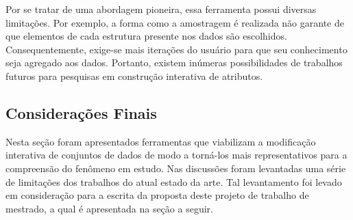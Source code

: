 Por se tratar de uma abordagem pioneira, essa ferramenta
possui diversas limitações. Por exemplo, a forma como a
amostragem é realizada não garante de que elementos de cada
estrutura presente nos dados são escolhidos.
Consequentemente, exige-se mais iterações do usuário 
para que seu conhecimento seja agregado aos dados. Portanto,
existem inúmeras possibilidades de trabalhos futuros para
pesquisas em construção interativa de atributos.

\subsection{Considerações Finais}

Nesta seção foram apresentados ferramentas que viabilizam a
modificação interativa de conjuntos de dados de modo a
torná-los mais representativos para a compreensão do
fenômeno em estudo.  Nas discussões foram levantadas uma
série de limitações dos trabalhos do atual estado da arte.
Tal levantamento foi levado em consideração para a escrita
da proposta deste projeto de trabalho de mestrado, a qual é
apresentada na seção a seguir.
